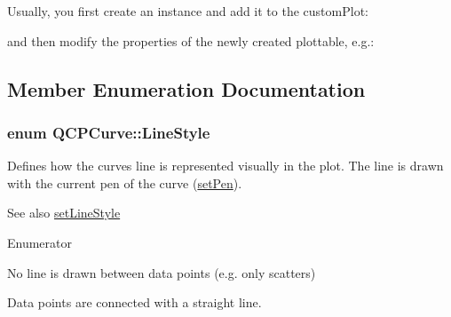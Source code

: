 Usually, you first create an instance and add it to the custom\+Plot\+: 
\begin{DoxyCodeInclude}
\end{DoxyCodeInclude}
and then modify the properties of the newly created plottable, e.\+g.\+: 
\begin{DoxyCodeInclude}
\end{DoxyCodeInclude}


\subsection{Member Enumeration Documentation}
\subsubsection[{\texorpdfstring{Line\+Style}{LineStyle}}]{\setlength{\rightskip}{0pt plus 5cm}enum {\bf Q\+C\+P\+Curve\+::\+Line\+Style}}\hypertarget{classQCPCurve_a2710e9f79302152cff794c6e16cc01f1}{}\label{classQCPCurve_a2710e9f79302152cff794c6e16cc01f1}
Defines how the curve\textquotesingle{}s line is represented visually in the plot. The line is drawn with the current pen of the curve (\hyperlink{classQCPAbstractPlottable_ab74b09ae4c0e7e13142fe4b5bf46cac7}{set\+Pen}). \begin{DoxySeeAlso}{See also}
\hyperlink{classQCPCurve_a4a377ec863ff81a1875c3094a6177c19}{set\+Line\+Style} 
\end{DoxySeeAlso}
\begin{Desc}
\item[Enumerator]\par
\begin{description}
\item[{\em 
ls\+None\hypertarget{classQCPCurve_a2710e9f79302152cff794c6e16cc01f1aec1601a191cdf0b4e761c4c66092cc48}{}\label{classQCPCurve_a2710e9f79302152cff794c6e16cc01f1aec1601a191cdf0b4e761c4c66092cc48}
}]No line is drawn between data points (e.\+g. only scatters) \item[{\em 
ls\+Line\hypertarget{classQCPCurve_a2710e9f79302152cff794c6e16cc01f1ade5822ce6fbf131d3df131795c2e1003}{}\label{classQCPCurve_a2710e9f79302152cff794c6e16cc01f1ade5822ce6fbf131d3df131795c2e1003}
}]Data points are connected with a straight line. \end{description}
\end{Desc}



